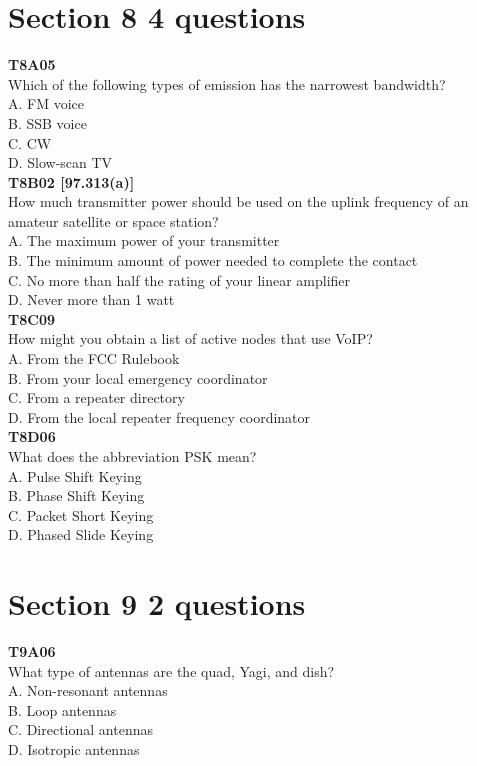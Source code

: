 \documentclass[12pt,letterpaper,twocolumn]{report}
\begin{document}
\section{Section 8 4 questions}

\textbf{T8A05}\\
Which of the following types of emission has the narrowest bandwidth?\\
A. FM voice\\
B. SSB voice\\
C. CW\\
D. Slow-scan TV\\

\textbf{T8B02 [97.313(a)]}\\
How much transmitter power should be used on the uplink frequency of an amateur satellite or space station?\\
A. The maximum power of your transmitter\\
B. The minimum amount of power needed to complete the contact\\
C. No more than half the rating of your linear amplifier\\
D. Never more than 1 watt\\

\textbf{T8C09}\\
How might you obtain a list of active nodes that use VoIP?\\
A. From the FCC Rulebook\\
B. From your local emergency coordinator\\
C. From a repeater directory\\
D. From the local repeater frequency coordinator\\

\textbf{T8D06}\\
What does the abbreviation PSK mean?\\
A. Pulse Shift Keying\\
B. Phase Shift Keying\\
C. Packet Short Keying\\
D. Phased Slide Keying\\

\section{Section 9 2 questions}

\textbf{T9A06}\\
What type of antennas are the quad, Yagi, and dish?\\
A. Non-resonant antennas\\
B. Loop antennas\\
C. Directional antennas\\
D. Isotropic antennas\\
\end{document}
